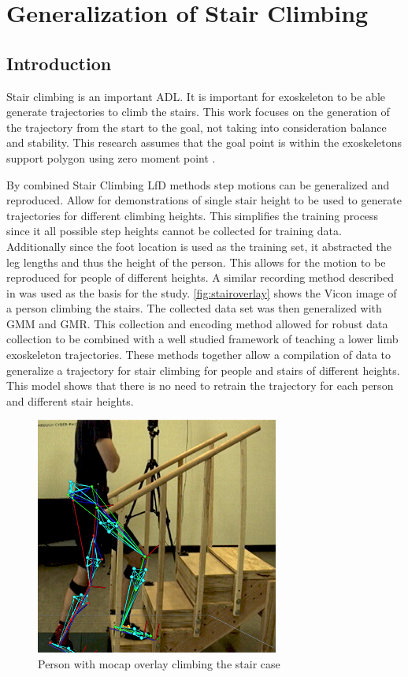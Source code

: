 \chapter{Generalization of Stair Climbing}

\section{Introduction}
Stair climbing is an important ADL. It is important for exoskeleton to be able generate trajectories to climb the stairs. This work focuses on the generation of the trajectory from the start to the goal, not taking into consideration balance and stability. This research assumes that the goal point is within the exoskeletons support polygon using zero moment point \cite{kajita2003biped}.


By combined Stair Climbing LfD methods step motions can be generalized and reproduced. Allow for demonstrations of single stair height to be used to generate trajectories for different climbing heights. This simplifies the training process since it all possible step heights cannot be collected for training data. Additionally since the foot location is used as the training set, it abstracted the leg lengths and thus the height of the person. This allows for the motion to be reproduced for people of different heights. A similar recording method described in \cite{hicks2011lower} was used as the basis for the study. \autoref{fig:stairoverlay} shows the Vicon image of a person climbing the stairs. The collected data set was then generalized with GMM and GMR. This collection and encoding method allowed for robust data collection to be combined with a well studied framework of teaching a lower limb exoskeleton trajectories. These methods together allow a compilation of data to generalize a trajectory for stair climbing for people and stairs of different heights. This model shows that there is no need to retrain the trajectory for each person and different stair heights.



\begin{figure}
    \centering
    \includegraphics{images/stairs/mocap_overlay_stairs.jpg}
    \caption[Stair mocap overlay]{Person with mocap overlay climbing the stair case}
    \label{fig:stairoverlay}
\end{figure}

